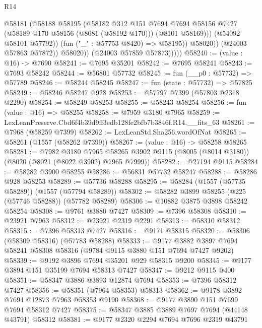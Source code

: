 \begin{lexlean}{R14}
\begin{coremodule}
                        @58181
                          (@58188
                            @58195
                            (@58182
                              @312
                              @151
                              @7694
                              @7694
                              @58156
                              @7427
                              (@58189 @170 @58156 (@8081 (@58192 @170)))
                              (@8101 @58169)))
                          (@54092 @58101 @57792))
                        (fun ("_" : @57753 @8420) => @58195))
                      @58020))
                  (@24003 @57863 @57872))
                @58020))
            (@24003 @57859 @57873)))))
@58240 := (value : @16) -> @7690
@58241 := @7695 @35201
@58242 := @7695 @58241
@58243 := @7693 @58242
@58244 := @56801 @57732
@58245 := fun (__p0 : @57732) => @57789
@58246 := @58244 @58245
@58247 := fun (state : @57732) => @57825
@58249 := @58246 @58247 @928
@58253 := @57797 @7399 (@57803 @2318 @2290)
@58254 := @58249 @58253
@58255 := @58243 @58254
@58256 := fun (value : @16) => @58255
@58258 := @7959 @3180 @7965
@58259 := LexLeanPreserve.Cbd6f4b39d9ff3edb128fe2bfb7b3846f.R14.__fits_63
@58261 := @7968 (@58259 @7399)
@58262 := LexLeanStd.Sha256.wordOfNat
@58265 := @58261 (@1557 (@58262 @7399))
@58267 := (value : @16) -> @58258 @58265
@58281 := @7982
    @3180
    @7965
    @58265
    @3902
    @9115
    (@8005 (@8014 @3180))
    (@8020 (@8021 (@8022 @3902) @7965 @7999))
@58282 := @27194 @9115
@58284 := @58282 @3900 @58255
@58286 := @56831 @57732 @58247
@58288 := @58286 @928 @58253
@58289 := @57736 @58288
@58295 := @58284 (@1557 (@57735 @58289)) (@1557 (@57794 @58289))
@58302 := @58282 @3899 @58255 (@225 (@57746 @58288)) (@57782 @58289)
@58306 := @10882 @3875 @3898 @58242 @58254
@58308 := @9761 @3880 @7427
@58309 := @7396 @58308
@58310 := @23921 @7963
@58312 := @23921 @2319 @2291
@58313 := @58310 @58312
@58315 := @7396 @58313 @7427
@58316 := @9171 @58315
@58320 := @58306 (@58309 @58316) (@57783 @58288)
@58333 := @9177 @3882 @3897 @7694 @58241 @58308 @58316 (@9784 @9115 @3880 @151 @7694 @7427 @9202)
@58339 := @9192 @3896 @7694 @35201 @929 @58315 @9200
@58345 := @9177 @3894 @151 @35199 @7694 @58313 @7427
@58347 := @9212 @9115 @400
@58351 := @58347 @3886 @3893 @12874 @7694
@58353 := @7396 @58312 @7427
@58356 := @58351 (@7964 @58353) @58313
@58362 := @9178 @3892 @7694 @12873 @7963 @58353 @9190
@58368 := @9177 @3890 @151 @7699 @7694 @58312 @7427
@58375 := @58347 @3885 @3889 @7697 @7694 (@44148 @43791) @58312
@58381 := @9177 @2320 @2294 @7694 @7696 @2319 @43791

\end{coremodule}
\end{lexlean}
